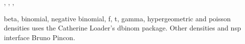 


\begin{manseealso}
  , , ,   
\end{manseealso}


\begin{authors}
  beta, binomial, negative binomial, f, t, gamma, hypergeometric and 
  poisson densities uses the Catherine Loader's dbinom package. Other 
  densities and nsp interface Bruno Pincon.
\end{authors}

